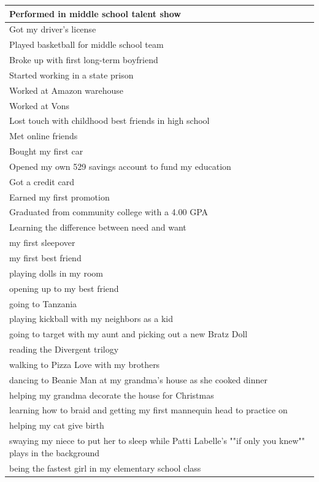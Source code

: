 \documentclass[
  .7em,
  letterpaper,
  DIV=11,
  numbers=noendperiod]{scrartcl}
\begin{document}
\begin{table}
\begin{tabular}{l}
\hline
Performed in middle school talent show\\
\hline
Got my driver's license\\
\hline
Played basketball for middle school team\\
\hline
Broke up with first long-term boyfriend\\
\hline
Started working in a state prison\\
\hline
Worked at Amazon warehouse\\
\hline
Worked at Vons\\
\hline
Lost touch with childhood best friends in high school\\
\hline
Met online friends\\
\hline
Bought my first car\\
\hline
Opened my own 529 savings account to fund my education\\
\hline
Got a credit card\\
\hline
Earned my first promotion\\
\hline
Graduated from community college with a 4.00 GPA\\
\hline
Learning the difference between need and want\\
\hline
my first sleepover\\
\hline
my first best friend\\
\hline
playing dolls in my room\\
\hline
opening up to my best friend\\
\hline
going to Tanzania\\
\hline
playing kickball with my neighbors as a kid\\
\hline
going to target with my aunt and picking out a new Bratz Doll\\
\hline
reading the Divergent trilogy\\
\hline
walking to Pizza Love with my brothers\\
\hline
dancing to Beanie Man at my grandma's house as she cooked dinner\\
\hline
helping my grandma decorate the house for Christmas\\
\hline
learning how to braid and getting my first mannequin head to practice on\\
\hline
helping my cat give birth\\
\hline
swaying my niece to put her to sleep while Patti Labelle's ""if only you knew"" plays in the background\\
\hline
being the fastest girl in my elementary school class\\

\end{tabular}
\end{table}
\end{document}
